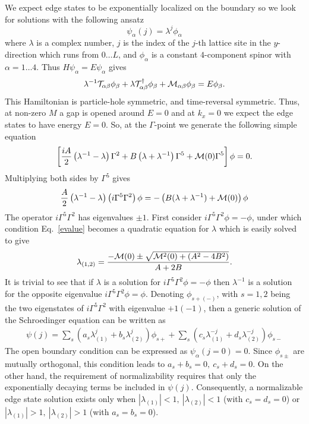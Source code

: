 \documentclass{article}
\begin{document}
We expect edge states to be exponentially localized on the boundary
so we look for solutions with the following
ansatz~\cite{creutz1994,creutz2001}
\begin{equation}
\psi_{\alpha}(j)=\lambda^j \phi_{\alpha}\label{ansatz}
\end{equation}\noindent where $\lambda$ is a complex number, $j$ is
the index of the $j$-th lattice site in the $y$-direction which runs
from $0\ldots L$,  and $\phi_{\alpha}$ is a constant $4$-component
spinor with $\alpha=1\ldots 4.$ Thus $H\psi_{\alpha}=E
\psi_{\alpha}$ gives
\begin{equation}
\lambda^{-1}{\cal{T}}_{\alpha\beta}\phi_{\beta}+\lambda{\cal{T}}^{\dagger}_{\alpha\beta}\phi_{\beta}+{\cal{M}}_{\alpha\beta}\phi_{\beta}=E\phi_{\beta}.
\end{equation}\noindent This Hamiltonian is particle-hole symmetric,
 and time-reversal symmetric. Thus, at
non-zero $M$ a gap is opened around $E=0$ and at $k_x=0$ we expect
the edge states to have energy $E=0.$ So, at the $\Gamma$-point we
generate the following simple equation
\begin{equation}
\left[\frac{i
A}{2}\left(\lambda^{-1}-\lambda\right)\Gamma^2+B\left(\lambda+\lambda^{-1}\right)\Gamma^5+{\cal{M}}(0)\Gamma^5\right]\phi=0.\end{equation}
\noindent Multiplying both sides by $\Gamma^5$  gives
\begin{equation}
\frac{A}{2}\left(\lambda^{-1}-\lambda\right)\left(i\Gamma^5\Gamma^2\right)\phi=-\left(B(\lambda+\lambda^{-1})+{\cal{M}}(0)\right)\phi
\label{evalue}\end{equation}\noindent The operator
$i\Gamma^5\Gamma^2$ has eigenvalues $\pm 1$. First consider
$i\Gamma^5\Gamma^2\phi=-\phi$, under which condition
Eq.~\ref{evalue} becomes a quadratic equation for $\lambda$ which is
easily solved to give
\begin{equation}
\lambda_{(1,2)}=\frac{-{\cal{M}}(0)\pm\sqrt{{\cal{M}}^2(0)+(A^2-4B^2)}}{A+2B}.
\end{equation}\noindent It is trivial to see that if $\lambda$ is
a solution for $i\Gamma^5\Gamma^2\phi=-\phi$ then $\lambda^{-1}$
is a solution for the opposite eigenvalue
$i\Gamma^5\Gamma^2\phi=\phi$. Denoting $\phi_{s+(-)}$, with
$s=1,2$ being the two eigenstates of $i\Gamma^5\Gamma^2$ with
eigenvalue $+1(-1)$, then a generic solution of the Schroedinger
equation can be written as
\begin{eqnarray}
\psi(j)=\sum_s\left(a_s\lambda_{(1)}^j+b_s\lambda_{(2)}^j\right)\phi_{s+}+\sum_s\left(c_s\lambda_{(1)}^{-j}+d_s\lambda_{(2)}^{-j}\right)\phi_{s-}
\end{eqnarray}
The open boundary condition can be expressed as
$\psi_\alpha(j=0)=0$. Since $\phi_{s\pm}$ are mutually orthogonal,
this condition leads to $a_s+b_s=0,~c_s+d_s=0$. On the other hand,
the requirement of normalizability requires that only the
exponentially decaying terms be included in $\psi(j)$.
Consequently, a normalizable edge state solution exists only when
$|\lambda_{(1)}|<1,~|\lambda_{(2)}|<1$ (with $c_s=d_s=0$) or
$|\lambda_{(1)}|>1,~|\lambda_{(2)}|>1$ (with $a_s=b_s=0$).
\end{document}
